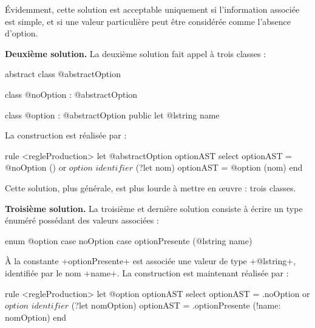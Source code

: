 Évidemment, cette solution est acceptable uniquement si l'information associée est simple, et si une valeur particulière peut être considérée comme l'absence d'option.

\textbf{Deuxième solution.} La deuxième solution fait appel à trois classes :
\begin{galgas4}
abstract class @abstractOption {}

class @noOption : @abstractOption {}

class @option : @abstractOption { public let @lstring name }
\end{galgas4}

La construction est réalisée par :
\begin{galgas4}
rule <regleProduction> {
  let @abstractOption optionAST
  select
    optionAST = @noOption ()
  or
    $option$
    $identifier$ (?let nom)
    optionAST = @option (nom)
  end
}
\end{galgas4}

Cette solution, plus générale, est plus lourde à mettre en œuvre : trois classes.

\textbf{Troisième solution.} La troisième et dernière solution consiste à écrire un type énuméré possédant des valeurs associées :

\begin{galgas4}
enum @option {
  case noOption
  case optionPresente (@lstring name)
}
\end{galgas4}

À la constante \ggst+optionPresente+ est associée une valeur de type \ggst+@lstring+, identifiée par le nom \ggst+name+. La construction est maintenant réalisée par :
\begin{galgas4}
rule <regleProduction> {
  let @option optionAST
  select
    optionAST = .noOption
  or
    $option$
    $identifier$ (?let nomOption)
    optionAST = .optionPresente (!name: nomOption)
  end
}
\end{galgas4}












